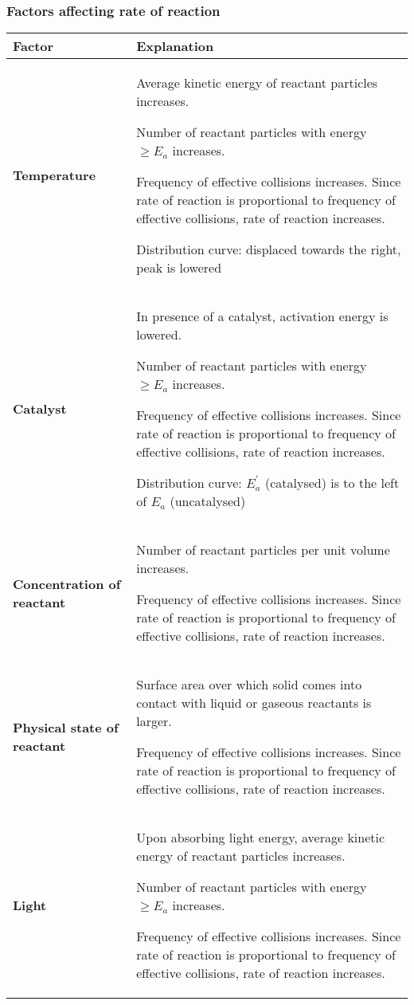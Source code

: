 \subsubsection{Factors affecting rate of reaction}
\begin{table}[H]
\begin{tabular}{|p{4cm}|p{11cm}|}
\hline
\textbf{Factor} & \textbf{Explanation} \\
\hline
\textbf{Temperature} & Average kinetic energy of reactant particles increases.

Number of reactant particles with energy $\ge E_a$ increases. 

Frequency of effective collisions increases. Since rate of reaction is proportional to frequency of effective collisions, rate of reaction increases.

Distribution curve: displaced towards the right, peak is lowered \\
\hline
\textbf{Catalyst} & In presence of a catalyst, activation energy is lowered. 

Number of reactant particles with energy $\ge E_a$ increases. 

Frequency of effective collisions increases. Since rate of reaction is proportional to frequency of effective collisions, rate of reaction increases.

Distribution curve: $E_a^\prime$ (catalysed) is to the left of $E_a$ (uncatalysed) \\
\hline
\textbf{Concentration of reactant} & Number of reactant particles per unit volume increases. 

Frequency of effective collisions increases. Since rate of reaction is proportional to frequency of effective collisions, rate of reaction increases. \\
\hline
\textbf{Physical state of reactant} & Surface area over which solid comes into contact with liquid or gaseous reactants is larger. 

Frequency of effective collisions increases. Since rate of reaction is proportional to frequency of effective collisions, rate of reaction increases. \\
\hline
\textbf{Light} & Upon absorbing light energy, average kinetic energy of reactant particles increases. 

Number of reactant particles with energy $\ge E_a$ increases. 

Frequency of effective collisions increases. Since rate of reaction is proportional to frequency of effective collisions, rate of reaction increases. \\
\hline
\end{tabular}
\end{table}

